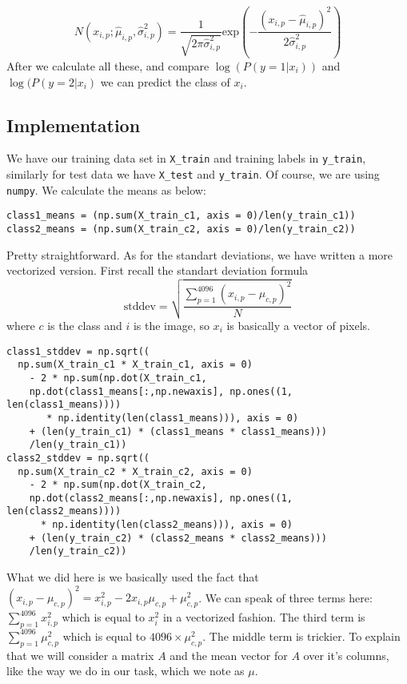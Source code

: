 \documentclass[12pt,reqno]{amsart}
\newcommand{\code}[1]{\texttt{#1}}
\begin{document}
\begin{equation}
N(x_{i,p};\hat{\mu}_{i,p},\hat{\sigma}_{i,p}^2) = \frac{1}{\sqrt{2\pi\hat{\sigma}_{i,p}^2}}\text{exp}\left(-\frac{(x_{i,p} - \hat{\mu}_{i,p})^2}{2\hat{\sigma}_{i,p}^2}\right)
\end{equation}
After we calculate all these, and compare $\log(P(y=1|x_i))$ and $\log(P(y=2|x_i)$ we can predict the class of $x_i$.
\subsection{Implementation}
We have our training data set in \code{X\_train} and training labels in \code{y\_train}, similarly for test data we have \code{X\_test} and \code{y\_train}. Of course, we are using \code{numpy}. We calculate the means as below:
\begin{lstlisting}
class1_means = (np.sum(X_train_c1, axis = 0)/len(y_train_c1))
class2_means = (np.sum(X_train_c2, axis = 0)/len(y_train_c2))
\end{lstlisting}
Pretty straightforward. As for the standart deviations, we have written a more vectorized version. First recall the standart deviation formula
$$
\text{stddev} = \sqrt{\frac{\sum_{p=1}^{4096}(x_{i,p} - \mu_{c,p})^2}{N}}
$$
where $c$ is the class and $i$ is the image, so $x_i$ is basically a vector of pixels. 
\begin{lstlisting}
class1_stddev = np.sqrt((
  np.sum(X_train_c1 * X_train_c1, axis = 0)
    - 2 * np.sum(np.dot(X_train_c1, 
    np.dot(class1_means[:,np.newaxis], np.ones((1, len(class1_means))))     
       * np.identity(len(class1_means))), axis = 0) 
    + (len(y_train_c1) * (class1_means * class1_means)))
    /len(y_train_c1))
class2_stddev = np.sqrt((
  np.sum(X_train_c2 * X_train_c2, axis = 0) 
    - 2 * np.sum(np.dot(X_train_c2, 
    np.dot(class2_means[:,np.newaxis], np.ones((1, len(class2_means)))) 
      * np.identity(len(class2_means))), axis = 0) 
    + (len(y_train_c2) * (class2_means * class2_means)))
    /len(y_train_c2))
\end{lstlisting}
What we did here is we basically used the fact that $(x_{i,p}-\mu_{c,p})^2 = x_{i,p}^2 - 2x_{i,p}\mu_{c,p} + \mu_{c,p}^2$. We can speak of three terms here: $\sum_{p=1}^{4096}x_{i,p}^2$ which is equal to $x_i^2$ in a vectorized fashion. The third term is $\sum_{p=1}^{4096} \mu_{c,p}^2$ which is equal to $4096\times \mu_{c,p}^2$. The middle term is trickier. To explain that we will consider a matrix $A$ and the mean vector for $A$ over it's columns, like the way we do in our task, which we note as $\mu$.
\end{document}
